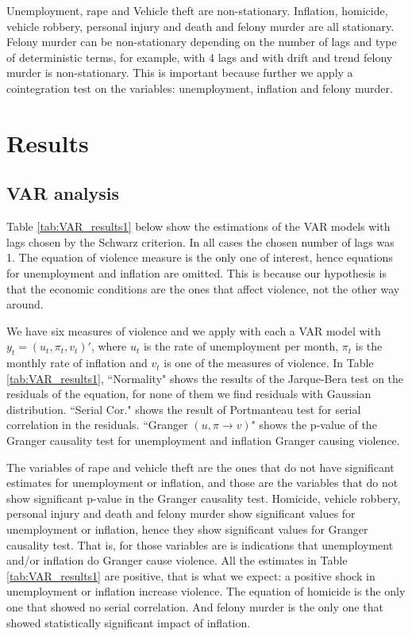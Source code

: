 \documentclass[11pt, a4paper]{article}
\begin{document}
Unemployment, rape and Vehicle theft are non-stationary. Inflation, homicide, vehicle robbery, personal injury and death and felony murder are all stationary. Felony murder can be non-stationary depending on the number of lags and type of deterministic terms, for example, with 4 lags and with drift and trend felony murder is non-stationary. This is important because further we apply a cointegration test on the variables: unemployment, inflation and felony murder.


\section{Results}

\subsection{VAR analysis}

Table \ref{tab:VAR_results1} below show the estimations of the VAR models with lags chosen by the Schwarz criterion. In all cases the chosen number of lags was 1. 
The equation of violence measure is the only one of interest, hence equations for unemployment and inflation are omitted. This is because our hypothesis is that the economic conditions are the ones that affect violence, not the other way around. 

We have six measures of violence and we apply with each a VAR model with $ y_t = (u_t,\pi_t, v_t )' $, where $u_t$ is the rate of unemployment per month, $\pi_t$ is the monthly rate of inflation and $v_t$ is one of the measures of violence. 
In Table \ref{tab:VAR_results1}, ``Normality" shows the results of the Jarque-Bera test on the residuals of the equation, for none of them we find residuals with Gaussian distribution. 
``Serial Cor." shows the result of Portmanteau test for serial correlation in the residuals. ``Granger  $ (u,\pi \rightarrow v  )$" shows the p-value of the Granger causality test for unemployment and inflation Granger causing violence. 

The variables of rape and vehicle theft are the ones that do not have significant estimates for unemployment or inflation, and those are the variables that do not show significant p-value in the Granger causality test.  Homicide, vehicle robbery, personal injury and death and felony murder show significant values for unemployment or inflation, hence they show significant values for Granger causality test. That is, for those variables are is indications that unemployment and/or inflation do Granger cause violence. All the estimates in Table \ref{tab:VAR_results1} are positive, that is what we expect: a positive shock in unemployment or inflation increase violence. The equation of homicide is the only one that showed no serial correlation. And felony murder is the only one that showed statistically significant impact of inflation.   
\end{document}
